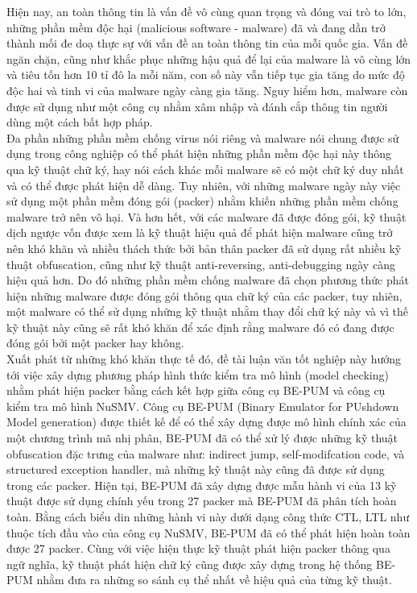 \setlength\parindent{0pt}
\hspace{0.5cm}Hiện nay, an toàn thông tin là vấn đề vô cùng quan trọng và đóng vai trò to lớn, những phần mềm độc hại (malicious software - malware) đã và đang dần trở thành mối đe doạ thực sự với vấn đề an toàn thông tin của mỗi quốc gia. Vấn đề ngăn chặn, cũng như khắc phục những hậu quả để lại của malware là vô cùng lớn và tiêu tốn hơn 10 tỉ đô la mỗi năm, con số này vẫn tiếp tục gia tăng do mức độ độc hai và tinh vi của malware ngày càng gia tăng. Nguy hiểm hơn, malware còn được sử dụng như một công cụ nhằm xâm nhập và đánh cắp thông tin người dùng một cách bất hợp pháp.\\  

\hspace{0.5cm}Đa phần những phần mềm chống virus nói riêng và malware nói chung được sử dụng trong công nghiệp có thể phát hiện những phần mềm độc hại này thông qua kỹ thuật chữ ký, hay nói cách khác mỗi malware sẽ có một chữ ký duy nhất và có thể được phát hiện dễ dàng. Tuy nhiên, với những malware ngày này việc sử dụng một phần mềm đóng gói (packer) nhằm khiến những phần mềm chống malware trở nên vô hại. Và hơn hết, với các malware đã được đóng gói, kỹ thuật dịch ngược vốn được xem là kỹ thuật hiệu quả để phát hiện malware cũng trở nên khó khăn và nhiều thách thức bởi bản thân packer đã sử dụng rất nhiều kỹ thuật obfuscation, cũng như kỹ thuật anti-reversing, anti-debugging ngày càng hiệu quả hơn. Do đó những phần mềm chống malware đã chọn phương thức phát hiện những malware được đóng gói thông qua chữ ký của các packer, tuy nhiên, một malware có thể sử dụng những kỹ thuật nhằm thay đổi chữ ký này và vì thế kỹ thuật này cũng sẽ rất khó khăn để xác định rằng malware đó có đang được đóng gói bởi một packer hay không.\\

\hspace{0.5cm}Xuất phát từ những khó khăn thực tế đó, đề tài luận văn tốt nghiệp này hướng tới việc xây dựng phương pháp hình thức kiểm tra mô hình (model checking) nhằm phát hiện packer bằng cách kết hợp giữa công cụ BE-PUM và công cụ kiểm tra mô hình NuSMV. Công cụ BE-PUM (Binary Emulator for PUshdown Model generation) được thiết kế để có thể xây dựng được mô hình chính xác của một chương trình mã nhị phân, BE-PUM đã có thể xử lý được những kỹ thuật obfuscation đặc trưng của malware như: indirect jump, self-modifcation code, và structured exception handler, mà những kỹ thuật này cũng đã được sử dụng trong các packer. Hiện tại, BE-PUM đã xây dựng được mẫu hành vi của 13 kỹ thuật được sử dụng chính yếu trong 27 packer mà BE-PUM đã phân tích hoàn toàn. Bằng cách biểu din những hành vi này dưới dạng công thức CTL, LTL như thuộc tích đầu vào của công cụ NuSMV, BE-PUM đã có thể phát hiện hoàn toàn được 27 packer. Cùng với việc hiện thực kỹ thuật phát hiện packer thông qua ngữ nghĩa, kỹ thuật phát hiện chữ ký cũng được xây dựng trong hệ thống BE-PUM nhằm đưa ra những so sánh cụ thể nhất về hiệu quả của từng kỹ thuật.\\

